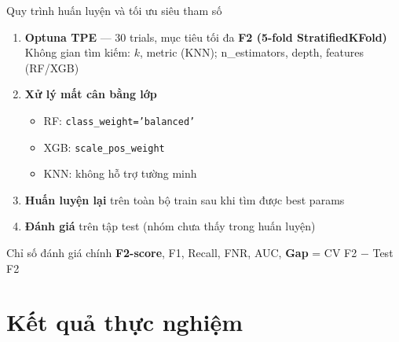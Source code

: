 \documentclass[aspectratio=169,12pt]{beamer}
\newcommand{\sidenote}[1]{\textcolor{mygray}{\small #1}}
\begin{document}
\begin{frame}{Quy trình huấn luyện và tối ưu siêu tham số}
  \begin{enumerate}
    \item \textbf{Optuna TPE} --- 30 trials, mục tiêu tối đa \textbf{F2 (5-fold StratifiedKFold)}\\
    \sidenote{Không gian tìm kiếm: $k$, metric (KNN); n\_estimators, depth, features (RF/XGB)}
    \vspace{0.4em}
    \item \textbf{Xử lý mất cân bằng lớp}
    \begin{itemize}
      \item RF: \texttt{class\_weight='balanced'}
      \item XGB: \texttt{scale\_pos\_weight}
      \item KNN: không hỗ trợ tường minh
    \end{itemize}
    \vspace{0.4em}
    \item \textbf{Huấn luyện lại} trên toàn bộ train sau khi tìm được best params
    \vspace{0.4em}
    \item \textbf{Đánh giá} trên tập test (nhóm chưa thấy trong huấn luyện)
  \end{enumerate}
  \vspace{0.5em}
  \begin{block}{Chỉ số đánh giá chính}
    \centering
    \textbf{F2-score}, F1, Recall, FNR, AUC, \textbf{Gap} = CV F2 $-$ Test F2
  \end{block}
\end{frame}

\section{Kết quả thực nghiệm}
\end{document}
